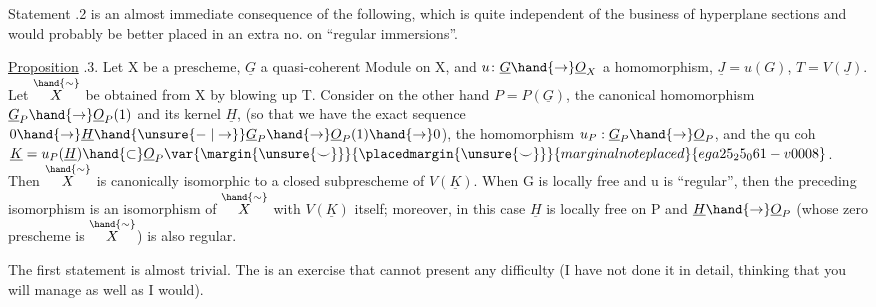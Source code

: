 
Statement .2 is an almost immediate consequence of the following,
which is quite independent of the business of hyperplane sections and
would probably be better placed in  an extra no. on
“regular immersions”.

\uline{Proposition} .3. Let X be a prescheme,  $\underline{G}$ a quasi-coherent Module
on X, and $u\colon \underline{G}\hand{\to}\underline{O}_X$ a homomorphism, $\underline{J} = u(G)$, $T=V(\underline{J})$. Let
$\overset{\hand{\sim}}{X}$ be obtained from X by blowing up T. Consider on the other hand
$P = P(\underline{G})$, the canonical homomorphism $\underline{G}_P\hand{\to}\underline{O}_P(1)$ and its kernel
$\underline{H}$, (so that we have the exact sequence $0\hand{\to}\underline{H}\hand{\unsure{\relbar|\to}}\underline{G}_P\hand{\to}\underline{O}_P(1)\hand{\to}0$),
the homomorphism $u_P : \underline{G}_P \hand{\to} \underline{O}_P$, and the qu coh  $\underline{K} = u_P(\underline{H})\hand{\subset}\underline{O}_P\var{\margin{\unsure{\smile}}}{\placedmargin{\unsure{\smile}}}{marginal note placed}{ega25_25_061-v0008}$.
Then $\overset{\hand{\sim}}{X}$ is canonically isomorphic to a closed subprescheme of
$V(\underline{K})$. When G is locally free and u is “regular”, then
the preceding isomorphism is an isomorphism of $\overset{\hand{\sim}}{X}$ with $V(\underline{K})$ itself;
moreover, in this case $\underline{H}$ is locally free on P and  $\underline{H}\hand{\to}\underline{O}_P$
(whose zero prescheme is $\overset{\hand{\sim}}{X}$) is also regular.

The first statement is almost trivial. The  is an
exercise that cannot present any difficulty (I have not done it in
detail, thinking that you will manage as well as I would).

